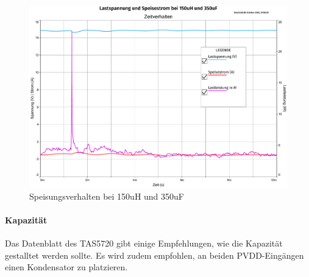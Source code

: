\begin{figure}[H]
	\centering
	\includegraphics[width=\textwidth*6/8]{pictures/2LoadsParallel_Lastspannung und Speisestrom bei 150uH und 350uF.pdf}
	\caption{Speisungsverhalten bei 150uH und 350uF}
	\label{pic:simulation_150uH_350uF}
\end{figure}
\paragraph{Kapazität}Das Datenblatt des TAS5720 gibt einige Empfehlungen, wie die Kapazität gestalltet werden sollte. Es wird zudem empfohlen, an beiden PVDD-Eingängen einen Kondensator zu platzieren.

